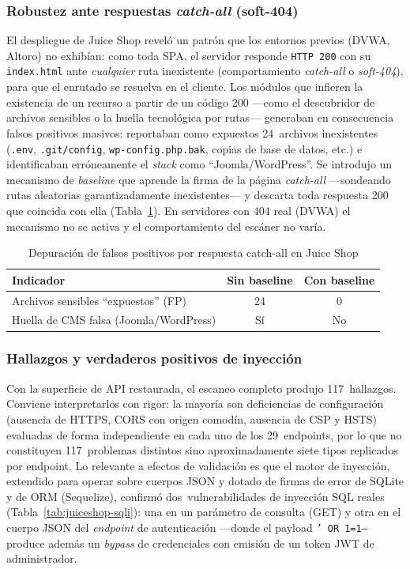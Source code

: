 \documentclass[12pt, a4paper]{article}
\begin{document}
\subsubsection{Robustez ante respuestas \textit{catch-all} (soft-404)}

El despliegue de Juice Shop reveló un patrón que los entornos previos (DVWA,
Altoro) no exhibían: como toda SPA, el servidor responde \texttt{HTTP~200} con su
\texttt{index.html} ante \textit{cualquier} ruta inexistente (comportamiento
\textit{catch-all} o \textit{soft-404}), para que el enrutado se resuelva en el
cliente. Los módulos que infieren la existencia de un recurso a partir de un
código 200 ---como el descubridor de archivos sensibles o la huella tecnológica
por rutas--- generaban en consecuencia falsos positivos masivos: reportaban como
expuestos 24~archivos inexistentes (\texttt{.env}, \texttt{.git/config},
\texttt{wp-config.php.bak}, copias de base de datos, etc.) e identificaban
erróneamente el \textit{stack} como ``Joomla/WordPress''. Se introdujo un
mecanismo de \textit{baseline} que aprende la firma de la página
\textit{catch-all} ---sondeando rutas aleatorias garantizadamente inexistentes---
y descarta toda respuesta 200 que coincida con ella (Tabla~\ref{tab:soft404}). En
servidores con 404 real (DVWA) el mecanismo no se activa y el comportamiento del
escáner no varía.

\begin{table}[H]
    \centering
    \caption{Depuración de falsos positivos por respuesta catch-all en Juice Shop}
    \label{tab:soft404}
    \begin{tabular}{l c c}
        \toprule
        \textbf{Indicador} & \textbf{Sin baseline} & \textbf{Con baseline} \\
        \midrule
        Archivos sensibles ``expuestos'' (FP) & 24 & 0 \\
        Huella de CMS falsa (Joomla/WordPress) & Sí & No \\
        \bottomrule
    \end{tabular}
\end{table}

\subsubsection{Hallazgos y verdaderos positivos de inyección}

Con la superficie de API restaurada, el escaneo completo produjo 117~hallazgos.
Conviene interpretarlos con rigor: la mayoría son deficiencias de configuración
(ausencia de HTTPS, CORS con origen comodín, ausencia de CSP y HSTS) evaluadas de
forma independiente en cada uno de los 29~endpoints, por lo que no constituyen
117~problemas distintos sino aproximadamente siete tipos replicados por endpoint.
Lo relevante a efectos de validación es que el motor de inyección, extendido para
operar sobre cuerpos JSON y dotado de firmas de error de SQLite y de ORM
(Sequelize), confirmó dos~vulnerabilidades de inyección SQL reales
(Tabla~\ref{tab:juiceshop-sqli}): una en un parámetro de consulta (GET) y otra en
el cuerpo JSON del \textit{endpoint} de autenticación ---donde el payload
\texttt{' OR 1=1--} produce además un \textit{bypass} de credenciales con emisión
de un token JWT de administrador.
\end{document}
